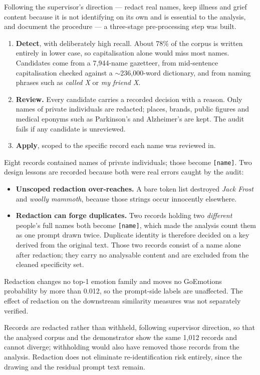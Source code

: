\documentclass[11pt,a4paper]{article}
\newcommand{\say}[1]{\textit{\color{soft}#1}}
\begin{document}
Following the supervisor's direction --- redact real names, keep illness and grief content because it
is not identifying on its own and is essential to the analysis, and document the procedure --- a
three-stage pre-processing step was built.

\begin{enumerate}
\item \textbf{Detect}, with deliberately high recall. About 78\% of the corpus is written entirely in
lower case, so capitalisation alone would miss most names. Candidates come from a 7{,}944-name gazetteer,
from mid-sentence capitalisation checked against a $\sim$236{,}000-word dictionary, and from naming
phrases such as \say{called X} or \say{my friend X}.
\item \textbf{Review.} Every candidate carries a recorded decision with a reason. Only names of
private individuals are redacted; places, brands, public figures and medical eponyms such as
Parkinson's and Alzheimer's are kept. The audit fails if any candidate is unreviewed.
\item \textbf{Apply}, scoped to the specific record each name was reviewed in.
\end{enumerate}

Eight records contained names of private individuals; those become \texttt{[name]}. Two design
lessons are recorded because both were real errors caught by the audit:

\begin{itemize}
\item \textbf{Unscoped redaction over-reaches.} A bare token list destroyed \say{Jack Frost} and
\say{woolly mammoth}, because those strings occur innocently elsewhere.
\item \textbf{Redaction can forge duplicates.} Two records holding two \emph{different} people's full
names both become \texttt{[name]}, which made the analysis count them as one prompt drawn twice.
Duplicate identity is therefore decided on a key derived from the original text. Those two records
consist of a name alone after redaction; they carry no analysable content and are excluded from the
cleaned specificity set.
\end{itemize}

Redaction changes no top-1 emotion family and moves no GoEmotions probability by more than 0.012, so
the prompt-side labels are unaffected. The effect of redaction on the downstream similarity measures
was not separately verified.

Records are redacted rather than withheld, following supervisor direction, so that the analysed corpus
and the demonstrator show the same 1{,}012 records and cannot diverge; withholding would also have
removed those records from the analysis. Redaction does not eliminate re-identification risk entirely,
since the drawing and the residual prompt text remain.
\end{document}
